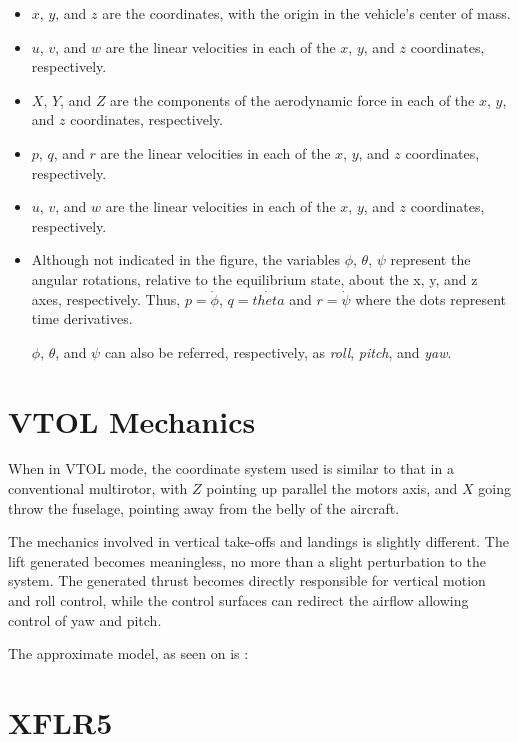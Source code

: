 \begin{itemize}

\item $x$, $y$, and $z$ are the coordinates, with the origin in the vehicle's center of mass.
\item $u$, $v$, and $w$ are the linear velocities in each of the $x$, $y$, and $z$ coordinates, respectively.
\item $X$, $Y$, and $Z$ are the components of the aerodynamic force in each of the $x$, $y$, and $z$ coordinates, respectively.
\item $p$, $q$, and $r$ are the linear velocities in each of the $x$, $y$, and $z$ coordinates, respectively.
\item $u$, $v$, and $w$ are the linear velocities in each of the $x$, $y$, and $z$ coordinates, respectively.
\item  Although not indicated in the figure, the variables $\phi$, $\theta$, $\psi$ represent the angular rotations,
relative to the equilibrium state, about the x, y, and z axes, respectively. Thus, $p=\dot{\phi}$, $q = \dot{theta}$
and $r = \dot{\psi}$ where the dots represent time derivatives.

$\phi$, $\theta$, and $\psi$ can also be referred, respectively, as \textit{roll}, \textit{pitch}, and \textit{yaw}.

\end{itemize}

\section{VTOL Mechanics}

When in VTOL mode, the coordinate system used is similar to that in a conventional multirotor, with $Z$ pointing up parallel the motors axis, and $X$ going throw the fuselage, pointing away from the belly of the aircraft.

The mechanics involved in vertical take-offs and landings is slightly different. The lift generated becomes meaningless, no more than a slight perturbation to the system. The generated thrust becomes directly responsible for vertical motion and roll control, while the control surfaces can redirect the airflow allowing control of yaw and pitch.

The approximate model, as seen on  is :



\section{XFLR5}

